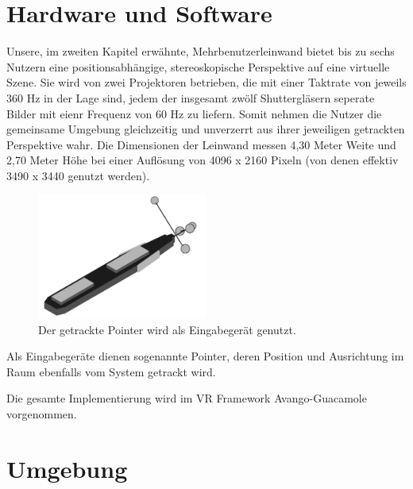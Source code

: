 \section{Hardware und Software}
Unsere, im zweiten Kapitel erwähnte, Mehrbenutzerleinwand bietet bis zu sechs Nutzern eine positionsabhängige, stereoskopische Perspektive auf eine virtuelle Szene. Sie wird von zwei Projektoren betrieben, die mit einer Taktrate von jeweils 360 Hz in der Lage sind, jedem der insgesamt zwölf Shuttergläsern seperate Bilder mit eienr Frequenz von 60 Hz zu liefern. Somit nehmen die Nutzer die gemeinsame Umgebung gleichzeitig und unverzerrt aus ihrer jeweiligen getrackten Perspektive wahr. Die Dimensionen der Leinwand messen 4,30 Meter Weite und 2,70 Meter Höhe bei einer Auflösung von 4096 x 2160 Pixeln (von denen effektiv 3490 x 3440 genutzt werden).

\begin{figure}[h]
  \centering
  \includegraphics[width=0.5\textwidth]{images/pointer.png}
  \caption{Der getrackte Pointer wird als Eingabegerät genutzt.}
  \label{fig:todo}
\end{figure}

Als Eingabegeräte dienen sogenannte \glqq Pointer\grqq{}, deren Position und Ausrichtung im Raum ebenfalls vom System getrackt wird.

Die gesamte Implementierung wird im VR Framework Avango-Guacamole \cite{Schneegans2014Guacamole-AnShading} vorgenommen.

\section{Umgebung}


